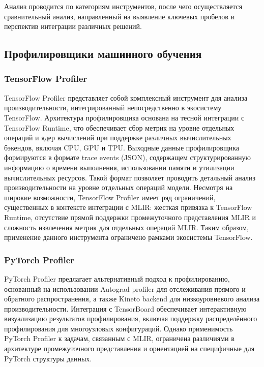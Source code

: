 Анализ проводится по категориям инструментов, после чего осуществляется сравнительный анализ, направленный на выявление ключевых пробелов и перспектив интеграции различных решений.

\subsection{Профилировщики машинного обучения}

\subsubsection{TensorFlow Profiler}
TensorFlow Profiler представляет собой комплексный инструмент для анализа производительности, интегрированный непосредственно в экосистему TensorFlow. Архитектура профилировщика основана на тесной интеграции с TensorFlow Runtime, что обеспечивает сбор метрик на уровне отдельных операций и ядер вычислений при поддержке различных вычислительных бэкендов, включая CPU, GPU и TPU. Выходные данные профилировщика формируются в формате trace events (JSON), содержащем структурированную информацию о времени выполнения, использовании памяти и утилизации вычислительных ресурсов. Такой формат позволяет проводить детальный анализ производительности на уровне отдельных операций модели.
Несмотря на широкие возможности, TensorFlow Profiler имеет ряд ограничений, существенных в контексте интеграции с MLIR: жесткая привязка к TensorFlow Runtime, отсутствие прямой поддержки промежуточного представления MLIR и сложность извлечения метрик для отдельных операций MLIR. Таким образом, применение данного инструмента ограничено рамками экосистемы TensorFlow.

\subsubsection{PyTorch Profiler}
PyTorch Profiler предлагает альтернативный подход к профилированию, основанный на использовании Autograd profiler для отслеживания прямого и обратного распространения, а также Kineto backend для низкоуровневого анализа производительности. Интеграция с TensorBoard обеспечивает интерактивную визуализацию результатов профилирования, включая поддержку распределённого профилирования для многоузловых конфигураций.
Однако применимость PyTorch Profiler к задачам, связанным с MLIR, ограничена различиями в архитектуре промежуточного представления и ориентацией на специфичные для PyTorch структуры данных.

